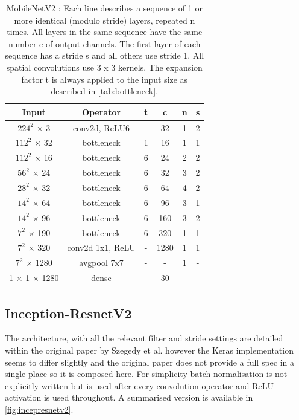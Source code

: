 \documentclass[12pt]{article}
\numberwithin{equation}{section}
\numberwithin{figure}{section}
\begin{document}
\begin{table}[]
	\centering
	\begin{tabular}{c|c|c|c|c|c}
	\hline
	\textbf{Input}         & \textbf{Operator} & \textbf{t} & \textbf{c} & \textbf{n} & \textbf{s} \\ \hline \hline
	$224^2$ $\times$ 3         & conv2d, ReLU6           & -          & 32         & 1          & 2          \\
	$112^2$ $\times$ 32        & bottleneck        & 1          & 16         & 1          & 1          \\
	$112^2$ $\times$ 16        & bottleneck        & 6          & 24         & 2          & 2          \\
	$56^2$ $\times$ 24         & bottleneck        & 6          & 32         & 3          & 2          \\
	$28^2$ $\times$ 32         & bottleneck        & 6          & 64         & 4          & 2          \\
	$14^2$ $\times$ 64         & bottleneck        & 6          & 96         & 3          & 1          \\
	$14^2$ $\times$ 96         & bottleneck        & 6          & 160        & 3          & 2          \\
	$7^2$ $\times$ 190         & bottleneck        & 6          & 320        & 1          & 1          \\
	$7^2$ $\times$ 320         & conv2d 1x1, ReLU        & -          & 1280       & 1          & 1          \\
	$7^2$ $\times$ 1280        & avgpool 7x7       & -          & -          & 1          & -          \\
	1 $\times$ 1 $\times$ 1280 & dense             & -          & 30         & -          & -          \\ \hline
	\end{tabular}%
	\caption{MobileNetV2 : Each line describes a sequence of 1 or more identical (modulo stride) layers, repeated n times. All layers in the same sequence have the same number c of output channels. The first layer of each sequence has a stride s and all others use stride 1. All
	spatial convolutions use 3 x 3 kernels. The expansion factor t is always applied to the input size as described in \cref{tab:bottleneck}.
	}
	\label{tab:mobilenetv2_arch}
	\end{table}

\subsection{Inception-ResnetV2} 
\label{sub:Inception-ResnetV2} 
The architecture, with all the relevant filter and stride settings are detailed within the original paper by Szegedy et al. \cite{Szegedy2016} however the Keras implementation seems to differ slightly and the original paper does not provide a full spec in a single place so it is composed here. For simplicity batch normalisation is not explicitly written but is used after every convolution operator and ReLU activation is used throughout. A summarised version is available in \cref{fig:incepresnetv2}\cite{Alemi2016}.
\end{document}
